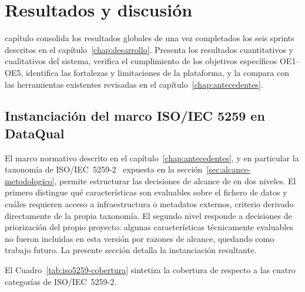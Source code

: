 \chapter{Resultados y discusión}
\label{chap:resultados}

 capítulo consolida los resultados globales de \dataqual una vez
completados los seis sprints descritos en el capítulo~\ref{chap:desarrollo}.
Presenta los resultados cuantitativos y cualitativos del sistema, verifica el
cumplimiento de los objetivos específicos OE1--OE5, identifica las fortalezas
y limitaciones de la plataforma, y la compara con las herramientas existentes
revisadas en el capítulo~\ref{chap:antecedentes}.


\section{Instanciación del marco \ac{ISO}/\ac{IEC} 5259 en DataQual}
\label{sec:instanciacion-iso5259}

El marco normativo descrito en el capítulo~\ref{chap:antecedentes},
y en particular la taxonomía de
\ac{ISO}/\ac{IEC}~5259-2~\citep{iso5259} expuesta en la
sección~\ref{sec:alcance-metodologico}, permite estructurar las decisiones
de alcance de \dataqual en dos niveles.  El primero distingue qué
características son evaluables sobre el fichero de datos y cuáles requieren
acceso a infraestructura o metadatos externos, criterio derivado
directamente de la propia taxonomía.  El segundo nivel responde a
decisiones de priorización del propio proyecto: algunas características
técnicamente evaluables no fueron incluidas en esta versión por razones de
alcance, quedando como trabajo futuro.  La presente sección
detalla la instanciación resultante.

El Cuadro~\ref{tab:iso5259-cobertura} sintetiza la cobertura de \dataqual
respecto a las cuatro categorías de \ac{ISO}/\ac{IEC}~5259-2.

